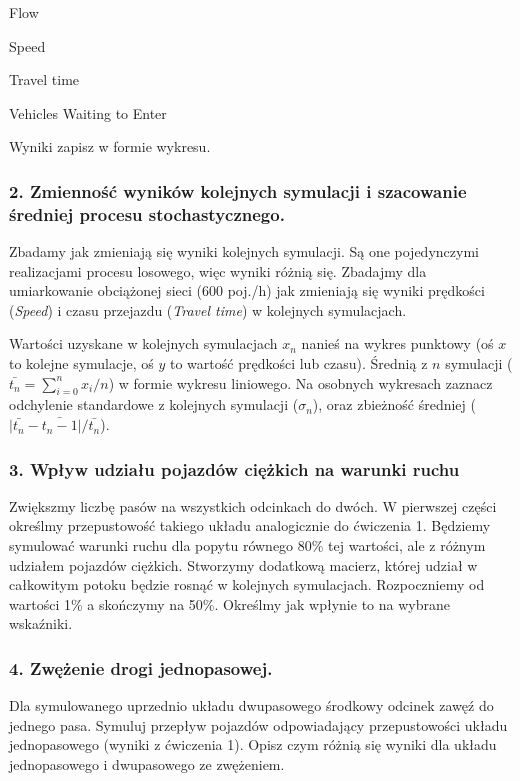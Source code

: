 \documentclass[11pt,a4paper]{article}
\begin{document}
\begin{compactenum}
\item Flow
\item Speed
\item Travel time
\item Vehicles Waiting to Enter
\end{compactenum}
Wyniki zapisz w formie wykresu.

\subsubsection*{2. Zmienność wyników kolejnych symulacji i szacowanie średniej procesu stochastycznego.}
Zbadamy jak zmieniają się wyniki kolejnych symulacji. Są one pojedynczymi realizacjami procesu losowego, więc wyniki różnią się. Zbadajmy dla umiarkowanie obciążonej sieci (600 poj./h) jak zmieniają się wyniki prędkości (\textit{Speed}) i czasu przejazdu (\textit{Travel time}) w kolejnych symulacjach. \par 
Wartości uzyskane w kolejnych symulacjach $x_n$ nanieś na wykres punktowy (oś $x$ to kolejne symulacje, oś $y$ to wartość prędkości lub czasu). Średnią z $n$ symulacji ($\bar{t_n} = \sum_{i=0}^n x_i /n $) w formie wykresu liniowego. Na osobnych wykresach zaznacz odchylenie standardowe z kolejnych symulacji ($\sigma_n$), oraz zbieżność średniej ($ \vert \bar{t_n} - \bar{t_n-1} \vert / \bar{t_n}$).

\subsubsection*{3. Wpływ udziału pojazdów ciężkich na warunki ruchu}
Zwiększmy liczbę pasów na wszystkich odcinkach do dwóch. W pierwszej części określmy przepustowość takiego układu analogicznie do ćwiczenia 1. 
Będziemy symulować warunki ruchu dla popytu równego 80\% tej wartości, ale z różnym udziałem pojazdów ciężkich. Stworzymy dodatkową macierz, której udział w całkowitym potoku będzie rosnąć w kolejnych symulacjach. Rozpoczniemy od wartości 1\% a skończymy na 50\%. Określmy jak wpłynie to na wybrane wskaźniki.

\subsubsection*{4. Zwężenie drogi jednopasowej.}
Dla symulowanego uprzednio układu dwupasowego środkowy odcinek zawęź do jednego pasa. Symuluj przepływ pojazdów odpowiadający przepustowości układu jednopasowego (wyniki z ćwiczenia 1). Opisz czym różnią się wyniki dla układu jednopasowego i dwupasowego ze zwężeniem.
\end{document}
